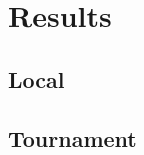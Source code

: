 \section{Results}\label{results}

\subsection{Local}\label{results:local}

\subsection{Tournament}\label{results:tournament}


